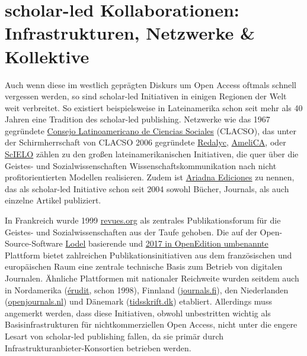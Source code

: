 \documentclass[a4paper,
fontsize=11pt,
oneside,
numbers=noperiodatend,
parskip=half-,
bibliography=totoc,
final
]{scrartcl}
\begin{document}
\hypertarget{scholar-led-kollaborationen-infrastrukturen-netzwerke-kollektive}{%
\section{scholar-led Kollaborationen: Infrastrukturen, Netzwerke
\&
Kollektive}\label{scholar-led-kollaborationen-infrastrukturen-netzwerke-kollektive}}

Auch wenn diese im westlich geprägten Diskurs um Open Access oftmals
schnell vergessen werden, so sind scholar-led Initiativen in einigen
Regionen der Welt weit verbreitet. So existiert beispielsweise in
Lateinamerika schon seit mehr als 40 Jahren eine Tradition des
scholar-led publishing. Netzwerke wie das 1967 gegründete
\href{https://www.clacso.org/en/what-is-clacso/}{Consejo Latinoamericano
de Ciencias Sociales} (CLACSO), das unter der Schirmherrschaft von
CLACSO 2006 gegründete \href{https://www.redalyc.org/}{Redalyc},
\href{http://amelica.org/index.php/en/about/}{AmeliCA}, oder
\href{https://scielo.org/}{ScIELO} zählen zu den großen
lateinamerikanischen Initiativen, die quer über die Geistes- und
Sozialwissenschaften Wissenschaftskommunikation nach nicht
profitorientierten Modellen realisieren. Zudem ist
\href{https://ariadnaediciones.cl/}{Ariadna Ediciones} zu nennen, das
als scholar-led Initiative schon seit 2004 sowohl Bücher, Journals, als
auch einzelne Artikel publiziert.

In Frankreich wurde 1999
\href{https://www.openedition.org/19220}{revues.org} als zentrales
Publikationsforum für die Geistes- und Sozialwissenschaften aus der
Taufe gehoben. Die auf der Open-Source-Software
\href{https://www.lodel.org/666}{Lodel} basierende und
\href{https://oep.hypotheses.org/1909}{2017 in OpenEdition umbenannte}
Plattform bietet zahlreichen Publikationsinitiativen aus dem
französischen und europäischen Raum eine zentrale technische Basis zum
Betrieb von digitalen Journalen. Ähnliche Plattformen mit nationaler
Reichweite wurden seitdem auch in Nordamerika
(\href{https://www.erudit.org/en/}{érudit}, schon 1998), Finnland
(\href{https://journal.fi/}{journals.fi}), den Niederlanden
(\href{https://openjournals.nl/}{openjournals.nl}) und Dänemark
(\href{https://tidsskrift.dk/}{tidsskrift.dk}) etabliert. Allerdings
muss angemerkt werden, dass diese Initiativen, obwohl unbestritten
wichtig als Basisinfrastrukturen für nichtkommerziellen Open Access,
nicht unter die engere Lesart von scholar-led publishing fallen, da sie
primär durch Infrastrukturanbieter-Konsortien betrieben werden.
\end{document}
